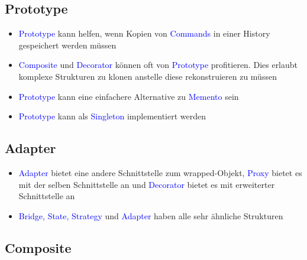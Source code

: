 \subsection{Prototype}

\begin{itemize}
    \item \textcolor{blue}{Prototype} kann helfen, wenn Kopien von \textcolor{blue}{Commands} in einer History gespeichert werden müssen
    \item \textcolor{blue}{Composite} und \textcolor{blue}{Decorator} können oft von \textcolor{blue}{Prototype} profitieren. Dies erlaubt komplexe Strukturen zu klonen anstelle diese rekonstruieren zu müssen
    \item \textcolor{blue}{Prototype} kann eine einfachere Alternative zu \textcolor{blue}{Memento} sein
    \item \textcolor{blue}{Prototype} kann als \textcolor{blue}{Singleton} implementiert werden
\end{itemize}

\subsection{Adapter}

\begin{itemize}
    \item \textcolor{blue}{Adapter} bietet eine andere Schnittstelle zum wrapped-Objekt, \textcolor{blue}{Proxy} bietet es mit der selben Schnittstelle an und \textcolor{blue}{Decorator} bietet es mit erweiterter Schnittstelle an
    \item \textcolor{blue}{Bridge, State, Strategy} und \textcolor{blue}{Adapter} haben alle sehr ähnliche Strukturen
\end{itemize}

\subsection{Composite}

